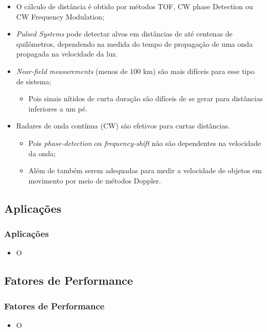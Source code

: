 \documentclass[xcolor=dvipsnames, aspectratio=169]{beamer}
\begin{document}
\begin{frame}
\begin{itemize}
    \newpage
    \item O cálculo de distância é obtido por métodos TOF, CW phase Detection ou CW Frequency Modulation;
    \item \textit{Pulsed Systems} pode detectar alvos em distâncias de até centenas de quilômetros, dependendo na medida do tempo de propagação de uma onda propagada na velocidade da luz.
    \item \textit{Near-field measurements} (menos de 100 km) são mais difíceis para esse tipo de sistema;
    \begin{itemize}
        \item Pois sinais nítidos de curta duração são difíceis de se gerar para distâncias inferiores a um pé.
    \end{itemize} 
    \item Radares de onda contínua (CW) são efetivos para curtas distâncias.
    \begin{itemize}
        \item Pois \textit{phase-detection} ou \textit{frequency-shift} não são dependentes na velocidade da onda;
        \item Além de também serem adequadas para medir a velocidade de objetos em movimento por meio de métodos Doppler.
    \end{itemize}
	\end{itemize}
	
\end{frame}


    \subsection[Introdução]{Aplicações} 
    \begin{frame}
    \frametitle{Aplicações}
        \begin{itemize}
            \item O
        \end{itemize}
    \end{frame}

    \subsection[Introdução]{Fatores de Performance} 
    \begin{frame}
    \frametitle{Fatores de Performance}
        \begin{itemize}
            \item O
        \end{itemize}
    \end{frame}
\end{document}
